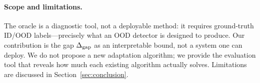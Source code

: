 \paragraph{Scope and limitations.} The \idonly{} oracle is a diagnostic tool, not a deployable method: it requires ground-truth ID/OOD labels---precisely what an OOD detector is designed to produce. Our contribution is the gap $\Delta_{\text{gap}}$ as an interpretable bound, not a system one can deploy. We do not propose a new adaptation algorithm; we provide the evaluation tool that reveals how much each existing algorithm actually solves. Limitations are discussed in Section~\ref{sec:conclusion}.
